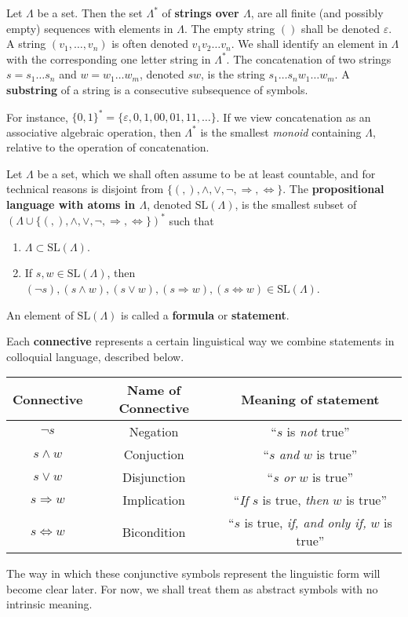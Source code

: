 \begin{definition}
    Let $\Lambda$ be a set. Then the set $\Lambda^*$ of {\bf strings over $\Lambda$}, are all finite (and possibly empty) sequences with elements in $\Lambda$. The empty string $()$ shall be denoted $\varepsilon$. A string $(v_1, \dots, v_n)$ is often denoted $v_1 v_2 \dots v_n$. We shall identify an element in $\Lambda$ with the corresponding one letter string in $\Lambda^*$. The concatenation of two strings $s = s_1 \dots s_n$ and $w = w_1 \dots w_m$, denoted $sw$, is the string $s_1 \dots s_n w_1 \dots w_m$. A {\bf substring} of a string is a consecutive subsequence of symbols.
\end{definition}

For instance, $\{ 0,1 \}^* = \{ \varepsilon, 0, 1, 00, 01, 11, \dots \}$. If we view concatenation as an associative algebraic operation, then $\Lambda^*$ is the smallest {\it monoid} containing $\Lambda$, relative to the operation of concatenation.

\begin{definition}
    Let $\Lambda$ be a set, which we shall often assume to be at least countable, and for technical reasons is disjoint from $\{ (, ), \wedge, \vee, \neg, \Rightarrow, \Leftrightarrow \}$. The {\bf propositional language with atoms in $\Lambda$}, denoted $\text{SL}(\Lambda)$, is the smallest subset of $(\Lambda \cup \{ (, ), \wedge, \vee, \neg, \Rightarrow, \Leftrightarrow \})^*$ such that
    \begin{enumerate}
        \item $\Lambda \subset \text{SL}(\Lambda)$.
        \item If $s, w \in \text{SL}(\Lambda)$, then $(\neg s), (s \wedge w), (s \vee w), (s \Rightarrow w), (s \Leftrightarrow w) \in \text{SL}(\Lambda)$.
    \end{enumerate}
    An element of $\text{SL}(\Lambda)$ is called a {\bf formula} or {\bf statement}.
\end{definition}

Each {\bf connective} represents a certain linguistical way we combine statements in colloquial language, described below.
%
\begin{center}
\begin{tabular}{| c | c | c |}
    \hline Connective & Name of Connective & Meaning of statement \\
    \hline $\neg s$ & Negation & ``$s$ is {\it not} true''\\
    $s \wedge w$ & Conjuction & ``$s$ {\it and} $w$ is true''\\
    $s \vee w$ & Disjunction & ``$s$ {\it or} $w$ is true''\\
    $s \Rightarrow w$ & Implication & ``{\it If} $s$ is true, {\it then} $w$ is true''\\
    $s \Leftrightarrow w$ & Bicondition & ``$s$ is true, {\it if, and only if,} $w$ is true''\\
    \hline
\end{tabular}
\end{center}
%
The way in which these conjunctive symbols represent the linguistic form will become clear later. For now, we shall treat them as abstract symbols with no intrinsic meaning.

